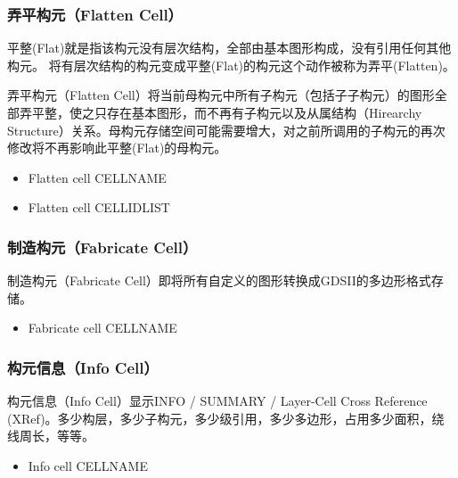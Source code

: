 \subsubsection{弄平构元（Flatten Cell）} \label{SectCmdFlatCell}
平整(Flat)就是指该构元没有层次结构，全部由基本图形构成，没有引用任何其他构元。
将有层次结构的构元变成平整(Flat)的构元这个动作被称为弄平(Flatten)。

弄平构元（Flatten Cell）将当前母构元中所有子构元（包括子子构元）的图形全部弄平整，使之只存在基本图形，而不再有子构元以及从属结构（Hirearchy Structure）关系。母构元存储空间可能需要增大，对之前所调用的子构元的再次修改将不再影响此平整(Flat)的母构元。
\begin{itemize}
	\item Flatten cell CELLNAME 
	\item Flatten cell CELLIDLIST 
\end{itemize}

\subsubsection{制造构元（Fabricate Cell）} \label{SectCmdFabCell}
制造构元（Fabricate Cell）即将所有自定义的图形转换成GDSII的多边形格式存储。
\begin{itemize}
	\item Fabricate cell CELLNAME
\end{itemize}

\subsubsection{构元信息（Info Cell）} \label{SectCmdInfoCell}
构元信息（Info Cell）显示INFO / SUMMARY / Layer-Cell Cross Reference (XRef)。多少构层，多少子构元，多少级引用，多少多边形，占用多少面积，绕线周长，等等。

\begin{itemize}
	\item Info cell CELLNAME
\end{itemize}

